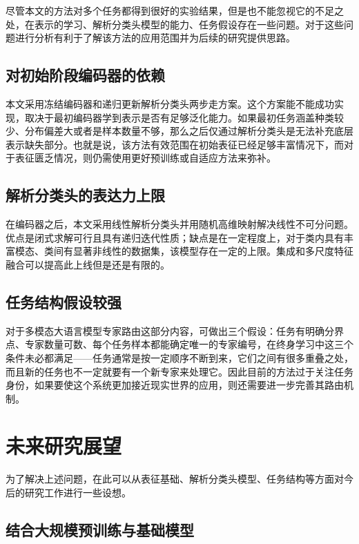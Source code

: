 尽管本文的方法对多个任务都得到很好的实验结果，但是也不能忽视它的不足之处，在表示的学习、解析分类头模型的能力、任务假设存在一些问题。对于这些问题进行分析有利于了解该方法的应用范围并为后续的研究提供思路。

\subsection{对初始阶段编码器的依赖}

本文采用冻结编码器和递归更新解析分类头两步走方案。这个方案能不能成功实现，取决于最初编码器学到表示是否有足够泛化能力。如果最初任务涵盖种类较少、分布偏差大或者是样本数量不够，那么之后仅通过解析分类头是无法补充底层表示缺失部分。也就是说，该方法有效范围在初始表征已经足够丰富情况下，而对于表征匮乏情况，则仍需使用更好预训练或自适应方法来弥补。

\subsection{解析分类头的表达力上限}

在编码器之后，本文采用线性解析分类头并用随机高维映射解决线性不可分问题。优点是闭式求解可行且具有递归迭代性质；缺点是在一定程度上，对于类内具有丰富模态、类间有显著非线性的数据集，该模型存在一定的上限。集成和多尺度特征融合可以提高此上线但是还是有限的。

\subsection{任务结构假设较强}

对于多模态大语言模型专家路由这部分内容，可做出三个假设：任务有明确分界点、专家数量可数、每个任务样本都能确定唯一的专家编号，在终身学习中这三个条件未必都满足——任务通常是按一定顺序不断到来，它们之间有很多重叠之处，而且新的任务也不一定就要有一个新专家来处理它。因此目前的方法过于关注任务身份，如果要使这个系统更加接近现实世界的应用，则还需要进一步完善其路由机制。



\section{未来研究展望}

为了解决上述问题，在此可以从表征基础、解析分类头模型、任务结构等方面对今后的研究工作进行一些设想。

\subsection{结合大规模预训练与基础模型}

